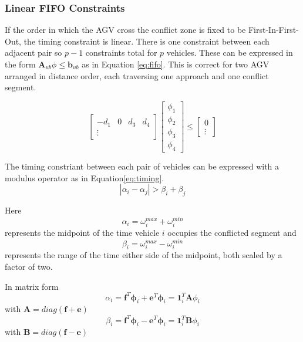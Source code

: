 \subsubsection{Linear FIFO Constraints}
\label{sec:fifo_constraints}
If the order in which the AGV cross the conflict zone is fixed to be First-In-First-Out, the timing constraint is linear. There is one constraint between each adjacent pair so $p-1$ constraints total for $p$ vehicles. These can be expressed in the form $\bm{A}_{ub}\phi \leq \bm{b}_{ub}$  as in Equation \ref{eq:fifo}. This is correct for two AGV arranged in distance order, each traversing one approach and one conflict segment. 

\begin{equation}
\left[ 
\begin{array}{ccccc}
-d_1 & 0 & d_3 & d_4 \\
\vdots 
\end{array} \right]
\left[
 \begin{array}{c}
  \phi_1 \\ \phi_2 \\ \phi_3 \\ \phi_4
 \end{array} \right]
\leq
\left[ 
\begin{array}{c}
0 \\ \vdots
\end{array} \right]
\label{eq:fifo}
\end{equation}

 The timing constriant between each pair of vehicles can be expressed with a modulus operator as in Equation\ref{eq:timing}.
\begin{equation}
|\alpha_i - \alpha_j| > \beta_i + \beta_j
\label{eq:timing}
\end{equation}

Here 
\begin{equation}
\alpha_i  = \omega_i^{max} + \omega_i^{min}
\label{eq:alpha}
\end{equation}
represents the midpoint of the time vehicle $i$ occupies the conflicted segment and
\begin{equation}
\beta_i  = \omega_i^{max} - \omega_i^{min}
\label{eq:beta}
\end{equation}
represents the range of the time either side of the midpoint, both scaled by a factor of two. 


In matrix form
\begin{equation}
\alpha_i  = \bm{f}^T \bm{\phi}_i + \bm{e}^T \bm{\phi}_i = \bm{1}_i^T\bm{A}{\phi}_i
\label{eq:alpha_m}
\end{equation}
with $\bm{A} = diag(\bm{f} + \bm{e})$
\begin{equation}
\beta_i  = \bm{f}^T \bm{\phi}_i - \bm{e}^T \bm{\phi}_i =  \bm{1}_i^T\bm{B}{\phi}_i
\label{eq:beta_m}
\end{equation}
with $\bm{B} = diag(\bm{f} - \bm{e})$

